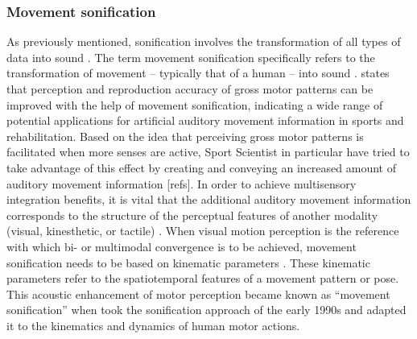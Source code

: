 \documentclass[10pt,a4paper,onecolumn]{article}
\begin{document}
\hypertarget{movement-sonification}{%
\subsubsection{Movement sonification}\label{movement-sonification}}

As previously mentioned, sonification involves the transformation of all types of data into sound \autocite{kramerSonificationReportStatus1999}. The term movement sonification specifically refers to the transformation of movement -- typically that of a human -- into sound \autocite{vinkenAuditoryCodingHuman2013}. \textcite{effenbergMovementSonificationEffects2005} states that perception and reproduction accuracy of gross motor patterns can be improved with the help of movement sonification, indicating a wide range of potential applications for artificial auditory movement information in sports and rehabilitation. Based on the idea that perceiving gross motor patterns is facilitated when more senses are active, Sport Scientist in particular have tried to take advantage of this effect by creating and conveying an increased amount of auditory movement information {[}refs{]}. In order to achieve multisensory integration benefits, it is vital that the additional auditory movement information corresponds to the structure of the perceptual features of another modality (visual, kinesthetic, or tactile) \autocite{schmitzSoundJoinedActions2017}. When visual motion perception is the reference with which bi- or multimodal convergence is to be achieved, movement sonification needs to be based on kinematic parameters \autocite{schmitzSoundJoinedActions2017}. These kinematic parameters refer to the spatiotemporal features of a movement pattern or pose. This acoustic enhancement of motor perception became known as ``movement sonification'' when \textcite{effenbergMovementSonificationEffects2005} took the sonification approach of the early 1990s and adapted it to the kinematics and dynamics of human motor actions.
\end{document}
